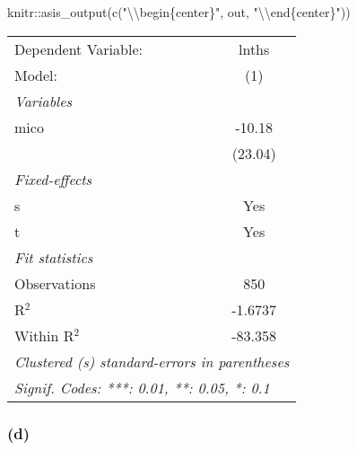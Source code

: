 \documentclass[
]{article}
\newenvironment{Shaded}{\begin{snugshade}}{\end{snugshade}}
\newcommand{\FunctionTok}[1]{\textcolor[rgb]{0.00,0.00,0.00}{#1}}
\newcommand{\NormalTok}[1]{#1}
\newcommand{\SpecialCharTok}[1]{\textcolor[rgb]{0.00,0.00,0.00}{#1}}
\newcommand{\StringTok}[1]{\textcolor[rgb]{0.31,0.60,0.02}{#1}}
\begin{document}
\begin{Shaded}
\begin{Highlighting}[]
\NormalTok{knitr}\SpecialCharTok{::}\FunctionTok{asis\_output}\NormalTok{(}\FunctionTok{c}\NormalTok{(}\StringTok{"}\SpecialCharTok{\textbackslash{}\textbackslash{}}\StringTok{begin\{center\}"}\NormalTok{, out, }\StringTok{"}\SpecialCharTok{\textbackslash{}\textbackslash{}}\StringTok{end\{center\}"}\NormalTok{)) }
\end{Highlighting}
\end{Shaded}

\begin{center}\begingroup\centering\begin{tabular}{lc}   \tabularnewline \midrule \midrule   Dependent Variable: & lnths\\     Model:              & (1)\\     \midrule   \emph{Variables}\\   mico                & -10.18\\                          & (23.04)\\      \midrule   \emph{Fixed-effects}\\   s                   & Yes\\     t                   & Yes\\     \midrule   \emph{Fit statistics}\\   Observations        & 850\\     R$^2$               & -1.6737\\     Within R$^2$        & -83.358\\     \midrule \midrule   \multicolumn{2}{l}{\emph{Clustered (s) standard-errors in parentheses}}\\   \multicolumn{2}{l}{\emph{Signif. Codes: ***: 0.01, **: 0.05, *: 0.1}}\\\end{tabular}\par\endgroup\end{center}

\hypertarget{d-1}{%
\subsubsection{(d)}\label{d-1}}
\end{document}
